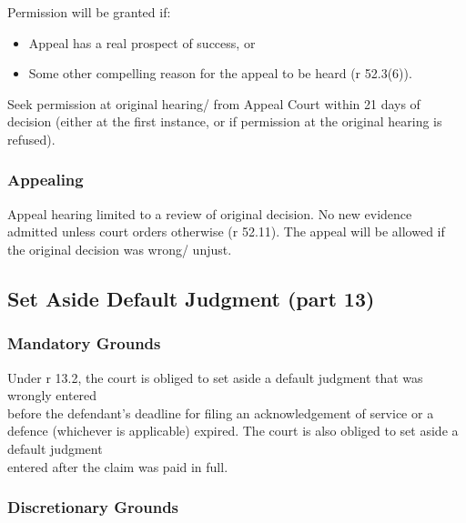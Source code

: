\documentclass[
]{article}
\providecommand{\tightlist}{%
  \setlength{\itemsep}{0pt}\setlength{\parskip}{0pt}}
\begin{document}
Permission will be granted if:

\begin{itemize}
\tightlist
\item
  Appeal has a real prospect of success, or
\item
  Some other compelling reason for the appeal to be heard (r 52.3(6)).
\end{itemize}

Seek permission at original hearing/ from Appeal Court within 21 days of
decision (either at the first instance, or if permission at the original
hearing is refused).

\hypertarget{appealing}{%
\subsubsection{Appealing}\label{appealing}}

Appeal hearing limited to a review of original decision. No new evidence
admitted unless court orders otherwise (r 52.11). The appeal will be
allowed if the original decision was wrong/ unjust.

\hypertarget{set-aside-default-judgment-part-13}{%
\subsection{Set Aside Default Judgment (part
13)}\label{set-aside-default-judgment-part-13}}

\hypertarget{mandatory-grounds}{%
\subsubsection{Mandatory Grounds}\label{mandatory-grounds}}

Under r 13.2, the court is obliged to set aside a default judgment that
was wrongly entered\\
before the defendant's deadline for filing an acknowledgement of service
or a defence (whichever is applicable) expired. The court is also
obliged to set aside a default judgment\\
entered after the claim was paid in full.

\hypertarget{discretionary-grounds}{%
\subsubsection{Discretionary Grounds}\label{discretionary-grounds}}
\end{document}
